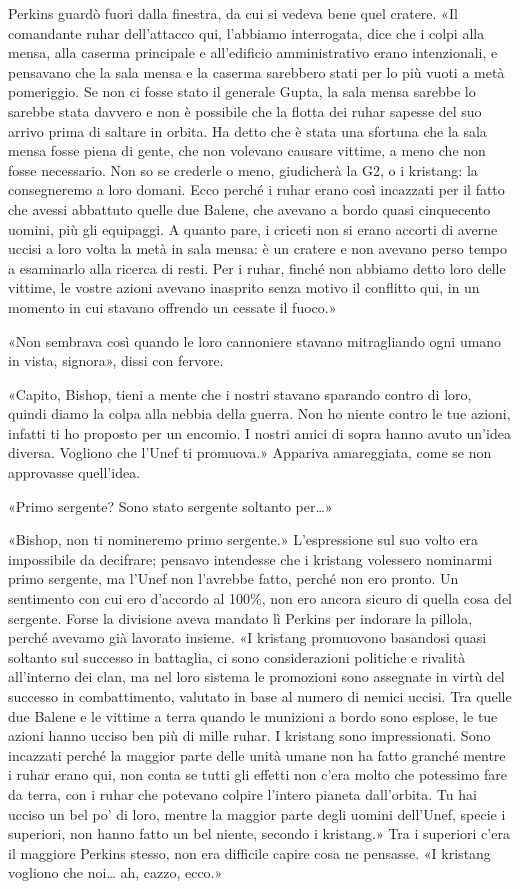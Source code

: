 Perkins guardò fuori dalla finestra, da cui si vedeva bene quel cratere.
«Il comandante ruhar dell'attacco qui, l'abbiamo interrogata, dice che i
colpi alla mensa, alla caserma principale e all'edificio amministrativo
erano intenzionali, e pensavano che la sala mensa e la caserma sarebbero
stati per lo più vuoti a metà pomeriggio. Se non ci fosse stato il
generale Gupta, la sala mensa sarebbe lo sarebbe stata davvero e non è
possibile che la flotta dei ruhar sapesse del suo arrivo prima di
saltare in orbita. Ha detto che è stata una sfortuna che la sala mensa
fosse piena di gente, che non volevano causare vittime, a meno che non
fosse necessario. Non so se crederle o meno, giudicherà la G2, o i
kristang: la consegneremo a loro domani. Ecco perché i ruhar erano così
incazzati per il fatto che avessi abbattuto quelle due Balene, che
avevano a bordo quasi cinquecento uomini, più gli equipaggi. A quanto
pare, i criceti non si erano accorti di averne uccisi a loro volta la
metà in sala mensa: è un cratere e non avevano perso tempo a esaminarlo
alla ricerca di resti. Per i ruhar, finché non abbiamo detto loro delle
vittime, le vostre azioni avevano inasprito senza motivo il conflitto
qui, in un momento in cui stavano offrendo un cessate il fuoco.»

«Non sembrava così quando le loro cannoniere stavano mitragliando ogni
umano in vista, signora», dissi con fervore.

«Capito, Bishop, tieni a mente che i nostri stavano sparando contro di
loro, quindi diamo la colpa alla nebbia della guerra. Non ho niente
contro le tue azioni, infatti ti ho proposto per un encomio. I nostri
amici di sopra hanno avuto un'idea diversa. Vogliono che l'Unef ti
promuova.» Appariva amareggiata, come se non approvasse quell'idea.

«Primo sergente? Sono stato sergente soltanto per\ldots»

«Bishop, non ti nomineremo primo sergente.» L'espressione sul suo volto
era impossibile da decifrare; pensavo intendesse che i kristang
volessero nominarmi primo sergente, ma l'Unef non l'avrebbe fatto,
perché non ero pronto. Un sentimento con cui ero d'accordo al 100\%, non
ero ancora sicuro di quella cosa del sergente. Forse la divisione aveva
mandato lì Perkins per indorare la pillola, perché avevamo già lavorato
insieme. «I kristang promuovono basandosi quasi soltanto sul successo in
battaglia, ci sono considerazioni politiche e rivalità all'interno dei
clan, ma nel loro sistema le promozioni sono assegnate in virtù del
successo in combattimento, valutato in base al numero di nemici uccisi.
Tra quelle due Balene e le vittime a terra quando le munizioni a bordo
sono esplose, le tue azioni hanno ucciso ben più di mille ruhar. I
kristang sono impressionati. Sono incazzati perché la maggior parte
delle unità umane non ha fatto granché mentre i ruhar erano qui, non
conta se tutti gli effetti non c'era molto che potessimo fare da terra,
con i ruhar che potevano colpire l'intero pianeta dall'orbita. Tu hai
ucciso un bel po' di loro, mentre la maggior parte degli uomini
dell'Unef, specie i superiori, non hanno fatto un bel niente, secondo i
kristang.» Tra i superiori c'era il maggiore Perkins stesso, non era
difficile capire cosa ne pensasse. «I kristang vogliono che noi\ldots{}
ah, cazzo, ecco.»


